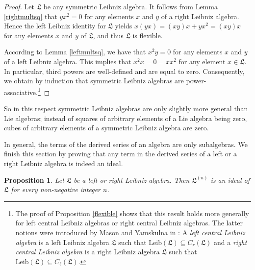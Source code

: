 \documentclass{amsart}
\newtheorem{pro}[thm]{Proposition}
\numberwithin{equation}{section}
\newcommand{\leib}{\mathrm{Leib}}
\newcommand{\lf}{\mathfrak{L}}
\begin{document}
\begin{proof}
Let $\lf$ be any symmetric Leibniz algebra. It follows from Lemma \ref{rightmultsq} that
$yx^2=0$ for any elements $x$ and $y$ of a right Leibniz algebra. Hence the left Leibniz
identity for $\lf$ yields $x(yx)=(xy)x+yx^2=(xy)x$ for any elements $x$ and $y$ of $\lf$,
and thus $\lf$ is flexible.

According to Lemma \ref{leftmultsq}, we have that $x^2y=0$ for any elements $x$ and
$y$ of a left Leibniz algebra. This implies that $x^2x=0=xx^2$ for any element $x\in\lf$.
In particular, third powers are well-defined and are equal to zero. Consequently, we obtain
by induction that symmetric Leibniz algebras are power-associative.\footnote{The proof
of Proposition \ref{flexible} shows that this result holds more generally for left central
Leibniz algebras or right central Leibniz algebras. The latter notions were introduced by
Mason and Yamskulna in \cite{MY}: A {\em left central Leibniz algebra\/} is a left Leibniz
algebra $\lf$ such that $\leib(\lf)\subseteq C_r(\lf)$ and a  {\em right central Leibniz
algebra\/} is a right Leibniz algebra $\lf$ such that $\leib(\lf)\subseteq C_\ell(\lf)$.}
\end{proof}

So in this respect symmetric Leibniz algebras are only slightly more general than Lie algebras;
instead of squares of arbitrary elements of a Lie algebra being zero, cubes of arbitrary elements
of a symmetric Leibniz algebra are zero.

In general, the terms of the derived series of an algebra are only subalgebras. We finish
this section by proving that any term in the derived series of a left or a right Leibniz algebra
is indeed an ideal.

\begin{pro}\label{derser}
Let $\lf$ be a left or right Leibniz algebra. Then $\lf^{(n)}$ is an ideal of $\lf$ for every
non-negative integer $n$.
\end{pro}
\end{document}
